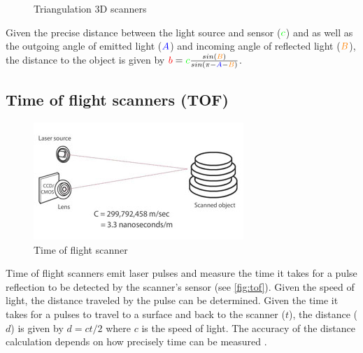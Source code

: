 \begin{figure}[H]
\begin{subfigure}[b]{.33\textwidth}
		\caption{}
	\end{subfigure}
	\caption{Triangulation 3D scanners \protect\footnotemark}
	\label{fig:triangulation-scanners}
\end{figure}

Given the precise distance between the light source and sensor ($\begingroup\color{green}c\endgroup$) and as well as the outgoing angle of emitted light ($\begingroup\color{blue}A\endgroup$) and incoming angle of reflected light ($\begingroup\color{orange}B\endgroup$), the distance to the object is given by $\begingroup\color{red}b\endgroup = \begingroup\color{green}c\endgroup\frac{ sin(\begingroup\color{orange}B\endgroup)}{sin(\pi - \begingroup\color{blue}A\endgroup-\begingroup\color{orange}B\endgroup)}$.

\subsection{Time of flight scanners (TOF)} \label{subsec:tof}

\begin{figure}[ht]
  \centering
  \includegraphics[width=.5\linewidth]{images/pulse-tof}
  \caption[Time of flight scanner]{Time of flight scanner \protect\footnotemark[\value{footnote}]}
  \label{fig:tof}
\end{figure}

Time of flight scanners emit laser pulses and measure the time it takes for a pulse reflection to be detected by the scanner's sensor (see \autoref{fig:tof}). Given the speed of light, the distance traveled by the pulse can be determined. Given the time it takes for a pulses to travel to a surface and back to the scanner ($t$), the distance ($d$) is given by $d = ct/2$ where $c$ is the speed of light. The accuracy of the distance calculation depends on how precisely time can be measured \cite{Form2014}.


